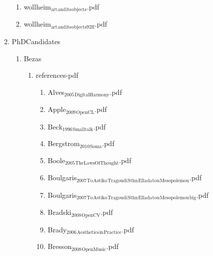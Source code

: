 \documentclass[11pt]{article}
\begin{document}
\begin{enumerate}
\begin{enumerate}
\begin{enumerate}
\item wollheim$_{\text{art}}$$_{\text{and}}$$_{\text{its}}$$_{\text{objects}}$.pdf
\label{sec-1-1-1-1-6-4}

\item wollheim$_{\text{art}}$$_{\text{and}}$$_{\text{its}}$$_{\text{objects92ff}}$.pdf
\label{sec-1-1-1-1-6-5}
\end{enumerate}

\item PhDCandidates
\label{sec-1-1-1-1-7}
\begin{enumerate}
\item Bezas
\label{sec-1-1-1-1-7-1}
\begin{enumerate}
\item references-pdf
\label{sec-1-1-1-1-7-1-1}
\begin{enumerate}
\item Alves$_{\text{2005}}$$_{\text{DigitalHarmony}}$.pdf
\label{sec-1-1-1-1-7-1-1-1}

\item Apple$_{\text{2009}}$$_{\text{OpenCL}}$.pdf
\label{sec-1-1-1-1-7-1-1-2}

\item Beck$_{\text{1996}}$$_{\text{Smalltalk}}$.pdf
\label{sec-1-1-1-1-7-1-1-3}

\item Bergstrom$_{\text{2010}}$$_{\text{Soma}}$.pdf
\label{sec-1-1-1-1-7-1-1-4}

\item Boole$_{\text{2005}}$$_{\text{TheLawsOfThought}}$.pdf
\label{sec-1-1-1-1-7-1-1-5}

\item Boulgaris$_{\text{2007}}$$_{\text{To}}$$_{\text{Astiko}}$$_{\text{Tragoudi}}$$_{\text{Sthn}}$$_{\text{Ellada}}$$_{\text{tou}}$$_{\text{Mesopolemou}}$.pdf
\label{sec-1-1-1-1-7-1-1-6}

\item Boulgaris$_{\text{2007}}$$_{\text{To}}$$_{\text{Astiko}}$$_{\text{Tragoudi}}$$_{\text{Sthn}}$$_{\text{Ellada}}$$_{\text{tou}}$$_{\text{Mesopolemou}}$$_{\text{big}}$.pdf
\label{sec-1-1-1-1-7-1-1-7}

\item Bradski$_{\text{2008}}$$_{\text{OpenCV}}$.pdf
\label{sec-1-1-1-1-7-1-1-8}

\item Brady$_{\text{2006}}$$_{\text{Aesthetics}}$$_{\text{in}}$$_{\text{Practice}}$.pdf
\label{sec-1-1-1-1-7-1-1-9}

\item Bresson$_{\text{2008}}$$_{\text{OpenMusic}}$.pdf
\label{sec-1-1-1-1-7-1-1-10}


\end{enumerate}
\end{enumerate}
\end{enumerate}
\end{enumerate}
\end{enumerate}
\end{document}
